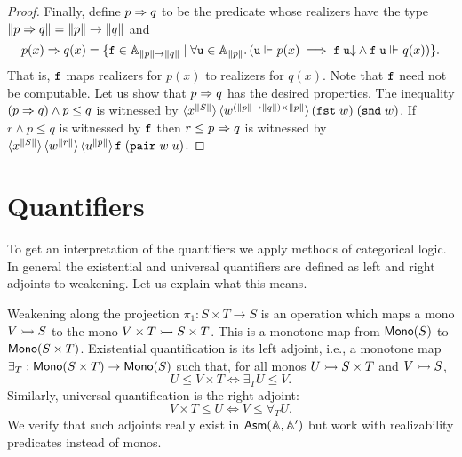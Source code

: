 \begin{proof}
  Finally, define $p \Rightarrow q$ to be the predicate whose realizers have
  the type $\|p \Rightarrow q\| = \|p\| \to \|q\|$ and
  \begin{equation*}
    p(x) \Rightarrow q(x) = \{
      \mathtt{f} \in \mathbb{A}_{\|p\| \to \|q\|} \mid
      \forall \mathtt{u} \in \mathbb{A}_{\|p\|} .\,
        (\mathtt{u} \Vdash_{} p(x)
        \implies
        \mathtt{f}\;\mathtt{u}{\downarrow} \land
        \mathtt{f}\;\mathtt{u} \Vdash_{} q(x))
    \}.
  \end{equation*}
  That is, $\mathtt{f}$ maps realizers for $p(x)$ to realizers for $q(x)$.
  Note that $\mathtt{f}$ need not be computable. Let us show that $p \Rightarrow
  q$ has the desired properties. The inequality $(p \Rightarrow q) \land p
  \leq q$ is witnessed by $\langle x^{\|S\|} \rangle\, \langle w^{(\|p\| \to
      \|q\|) \times \|p\|} \rangle\,{(\mathtt{fst}\;w)\; (\mathtt{snd}\;w)}$. If $r \land p
  \leq q$ is witnessed by $\mathtt{f}$ then $r \leq p \Rightarrow q$ is witnessed
  by $\langle x^{\|S\|} \rangle\, \langle w^{\|r\|} \rangle\,
    \langle u^{\|p\|} \rangle\, \mathtt{f}\;(\mathtt{pair}\;w\;u)$.
\end{proof}

\section{Quantifiers}
\label{sec:quantifiers}

To get an interpretation of the quantifiers we apply methods of
categorical logic. In general the existential and universal
quantifiers are defined as left and right adjoints to weakening. Let
us explain what this means.

Weakening along the projection $\pi_1 : S \times T \to
S$ is an operation which maps a mono $V \rightarrowtail S$
to the mono $V \times T \rightarrowtail S \times T$.
This is a monotone map from $\mathsf{Mono}(S)$ to $\mathsf{Mono}(S \times
  T)$. Existential quantification is its left adjoint, i.e., a
monotone map $\exists_{T} : \mathsf{Mono}(S \times T) \to
\mathsf{Mono}(S)$ such that, for all monos $U \rightarrowtail S
\times T$ and $V \rightarrowtail S$,
%
\begin{equation*}
  U \leq V \times T
  \iff
  \exists_{T} U \leq V.
\end{equation*}
%
Similarly, universal quantification is the right adjoint:
%
\begin{equation*}
  V \times T \leq U
  \iff
  V \leq \forall_{T} U.
\end{equation*}
%
We verify that such adjoints really exist in $\mathsf{Asm}(\mathbb{A},\mathbb{A}')$ but work with
realizability predicates instead of monos.

